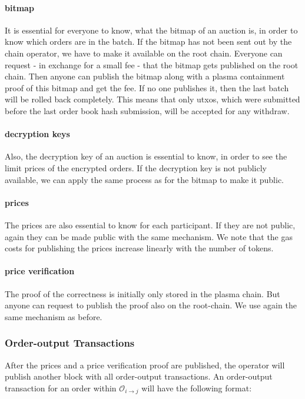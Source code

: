 \documentclass[11pt,parskip=full]{scrartcl}%
\def\pO{\mathcal{O}}
\def\ra{\rightarrow}
\begin{document}
\paragraph{bitmap}
It is essential for everyone to know, what the bitmap of an auction is, in order to know which orders are in the batch. 
If the bitmap has not been sent out by the chain operator, we have to make it available on the root chain. 
Everyone can request - in exchange for a small fee - that the bitmap gets published on the root chain. 
Then anyone can publish the bitmap along with a plasma containment proof of this bitmap and get the fee. 
If no one publishes it, then the last batch will be rolled back completely. 
This means that only utxos, which were submitted before the last order book hash submission, will be accepted for any withdraw. 

\paragraph{decryption keys}
Also, the decryption key of an auction is essential to know, in order to see the limit prices of the encrypted orders. 
If the decryption key is not publicly available, we can apply the same process as for the bitmap to make it public. 

\paragraph{prices}
The prices are also essential to know for each participant. 
If they are not public, again they can be made public with the same mechanism. 
We note that the gas costs for publishing the prices increase linearly with the number of tokens. 

\paragraph{price verification}
The proof of the correctness is initially only stored in the plasma chain. 
But anyone can request to publish the proof also on the root-chain. 
We use again the same mechanism as before. 


\subsubsection{Order-output Transactions}
After the prices and a price verification proof are published, the operator will publish another block with all order-output transactions. 
An order-output transaction for an order within $\pO_{i\ra j}$ will have the following format:
\end{document}

